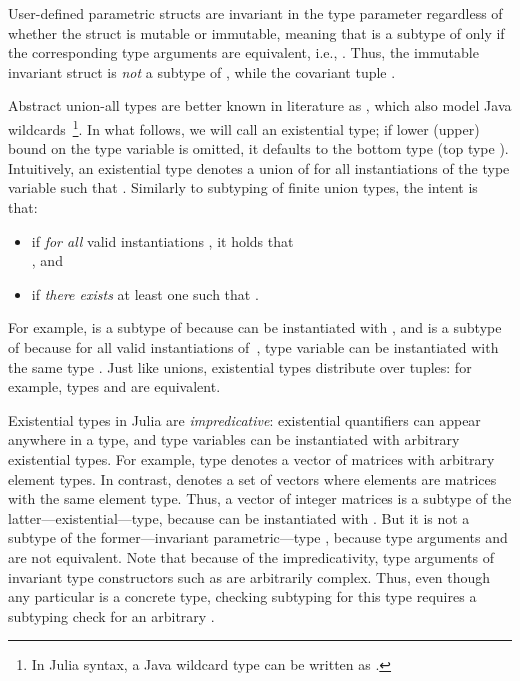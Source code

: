 User-defined parametric structs are invariant in the type parameter
regardless of whether the struct is
mutable or immutable, meaning that  is a subtype of 
 only if the corresponding type arguments are equivalent,
i.e., .
Thus, the immutable invariant struct  is \emph{not}
a subtype of ,
while the covariant tuple .

Abstract union-all types  are better known
in literature as , which also model
Java wildcards~\cite{torgersen:wildcards:2004}\footnote{In Julia syntax, 
a Java wildcard type
 can be written as .}.
In what follows, we will call  an existential type;
if lower (upper) bound on the type variable is omitted, it defaults to the
bottom type  (top type ).
Intuitively, an existential type denotes a union of  for all
instantiations of the type variable  such that .
Similarly to subtyping of finite union types, the intent is that:
\begin{itemize}
  \item {} if \emph{for all} valid instantiations
    , it holds that\\ , and
  \item {} if \emph{there exists} at least one 
     such that .
\end{itemize}
For example,  is a subtype of  because  can be instantiated with ,
and  is a subtype of
 because for all valid instantiations  of~,
type variable  can be instantiated with the same type .
Just like unions, existential types distribute over tuples:
for example, types 
and  are equivalent.

Existential types in Julia are \emph{impredicative}:
existential quantifiers can appear anywhere in a type,
and type variables can be instantiated with arbitrary existential types.
For example, type  denotes a vector
of matrices with arbitrary element types.
In contrast,  denotes a set of vectors where
elements are matrices with the same element type.
Thus, a vector of integer matrices  is a subtype
of the latter---existential---type, because  can be instantiated with
. But it is not a subtype of the former---invariant parametric---type
, because type arguments 
and  are not equivalent.
Note that because of the impredicativity, type arguments of invariant type
constructors such as  are arbitrarily complex. Thus, even though any
particular  is a concrete type, checking subtyping for this
type requires a subtyping check for an arbitrary .

